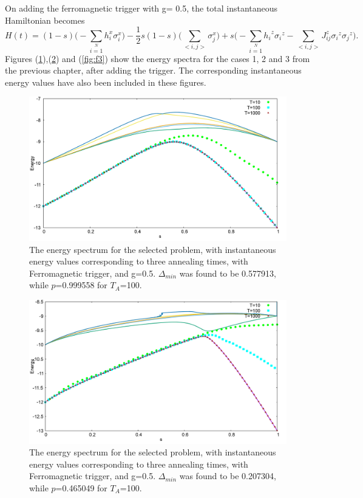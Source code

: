\documentclass[12]{article}
\begin{document}
On adding the ferromagnetic trigger with g= 0.5, the total instantaneous Hamiltonian becomes
\begin{equation}
H(t)=(1-s)\Big(-\sum \limits_{i=1}\limits^N h_i^x \sigma_i^x \Big)- \frac{1}{2}s(1-s)\Big( \sum \limits_{<i,j>}\sigma_{j}^x\Big) +s \Big(-\sum\limits_{i=1}\limits^{N}{h_i}^z{\sigma_i}^z - \sum\limits_{<i,j>}{J_{ij}^z} {\sigma_i}^z{\sigma_j}^z \Big).
\end{equation}
Figures (\ref{fig:f1}),(\ref{fig:f2}) and (\ref{fig:f3}) show the energy spectra for the cases 1, 2 and 3 from the previous chapter, after adding the trigger. The corresponding instantaneous energy values have also been included in these figures. 
\begin{figure}[H]
\centering 
\includegraphics[scale=0.3]{733_s12_F_g0.png}
\caption{The energy spectrum for the selected problem, with instantaneous energy values corresponding to three annealing times, with Ferromagnetic trigger, and g=0.5. $\Delta_{min}$ was found to be 0.577913, while $p$=0.999558 for $T_A$=100. }
\label{fig:f1}
\end{figure}
\begin{figure}[H]
\centering 
\includegraphics[scale=0.3]{950_s12_F_g0.png}
\caption{The energy spectrum for the selected problem, with instantaneous energy values corresponding to three annealing times, with Ferromagnetic trigger, and g=0.5. $\Delta_{min}$ was found to be 0.207304, while $p$=0.465049 for $T_A$=100.}
\label{fig:f2}
\end{figure}
\end{document}
